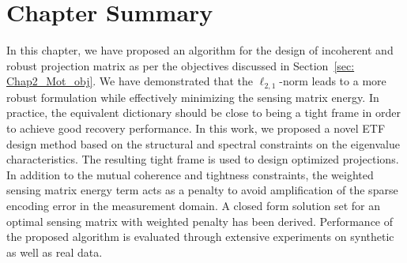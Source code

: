 \section{Chapter Summary}
%
In this chapter, we have proposed an algorithm for the design of incoherent and robust projection matrix as per the objectives discussed in Section~\ref{sec: Chap2_Mot_obj}. We have demonstrated that the $\ell_{2,1}$-norm leads to a more robust formulation while effectively minimizing the sensing matrix energy. In practice, the equivalent dictionary should be close to being a tight frame in order to achieve good recovery performance. In this work, we proposed a novel ETF design method based on the structural and spectral constraints on the eigenvalue characteristics. The resulting tight frame is used to design optimized projections. In addition to the mutual coherence and tightness constraints, the weighted sensing matrix energy term acts as a penalty to avoid amplification of the sparse encoding error in the measurement domain. A closed form solution set for an optimal sensing matrix with weighted penalty has been derived. Performance of the proposed algorithm is evaluated through extensive experiments on synthetic as well as real data.
